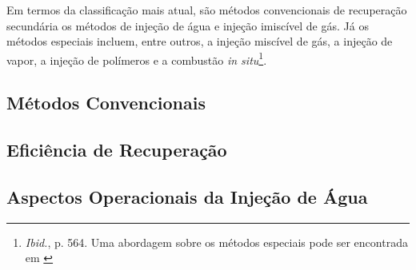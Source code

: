 Em termos da classificação mais atual, são métodos convencionais de recuperação secundária os métodos de injeção de água e injeção imiscível de gás. Já os métodos especiais incluem, entre outros, a injeção miscível de gás, a injeção de vapor, a injeção de polímeros e a combustão \textit{in situ}\footnote{\textit{Ibid.}, p. 564. Uma abordagem sobre os métodos especiais pode ser encontrada em \cite[pp. 677-726]{engres}}.

\subsection{Métodos Convencionais}

\subsection{Eficiência de Recuperação}

\subsection{Aspectos Operacionais da Injeção de Água}
